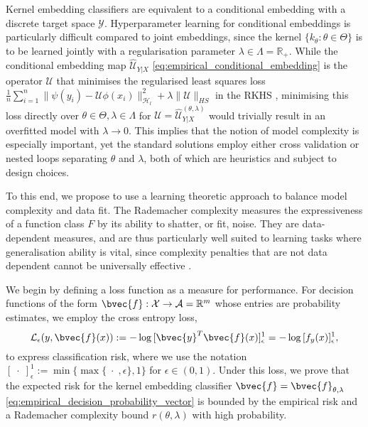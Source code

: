 \documentclass{article}
\begin{document}
	Kernel embedding classifiers are equivalent to a conditional embedding with a discrete target space $\mathcal{Y}$. Hyperparameter learning for conditional embeddings is particularly difficult compared to joint embeddings, since the kernel $\{k_{\theta} : \theta \in \Theta\}$ is to be learned jointly with a regularisation parameter $\lambda \in \Lambda = \mathbb{R}_{+}$. While the conditional embedding map $\hat{\mathcal{U}}_{Y | X}$ \eqref{eq:empirical_conditional_embedding} is the operator $\mathcal{U}$ that minimises the regularised least squares loss $\frac{1}{n} \sum_{i = 1}^{n} \| \psi(y_{i}) - \mathcal{U} \phi(x_{i}) \|_{\mathcal{H}_{l}}^{2} + \lambda \| \mathcal{U} \|_{HS}$ in the RKHS \citep{song2013kernel}, minimising this loss directly over $\theta \in \Theta, \lambda \in \Lambda$ for $\mathcal{U} = \hat{\mathcal{U}}^{(\theta, \lambda)}_{Y | X}$ would trivially result in an overfitted model with $\lambda \rightarrow 0$. This implies that the notion of model complexity is especially important, yet the standard solutions employ either cross validation or nested loops separating $\theta$ and $\lambda$, both of which are heuristics and subject to design choices.
	
	To this end, we propose to use a learning theoretic approach to balance model complexity and data fit. The Rademacher complexity \citep{bartlett2002rademacher} measures the expressiveness of a function class $F$ by its ability to shatter, or fit, noise. They are data-dependent measures, and are thus particularly well suited to learning tasks where generalisation ability is vital, since complexity penalties that are not data dependent cannot be universally effective \citep{kearns1997experimental}. 
	
	We begin by defining a loss function as a measure for performance. For decision functions of the form $\bvec{f} : \mathcal{X} \to \mathcal{A} = \mathbb{R}^{m}$ whose entries are probability estimates, we employ the cross entropy loss,
	\begin{equation}
		\mathcal{L}_{\epsilon}(y, \bvec{f}(x)) := - \log{ [\bvec{y}^{T} \bvec{f}(x)]_{\epsilon}^{1} } = - \log{ [f_{y}(x)]_{\epsilon}^{1} },
	\label{eq:cross_entropy_loss_copy}
	\end{equation}
	to express classification risk, where we use the notation $[\;\cdot\;]_{\epsilon}^{1} := \min\{\max\{\;\cdot\;, \epsilon\}, 1\}$ for $\epsilon \in (0, 1)$. Under this loss, we prove that the expected risk for the kernel embedding classifier $\bvec{f} = \bvec{f}_{\theta, \lambda}$ \eqref{eq:empirical_decision_probability_vector} is bounded by the empirical risk and a Rademacher complexity bound $r(\theta, \lambda)$ with high probability. %
	
\end{document}
